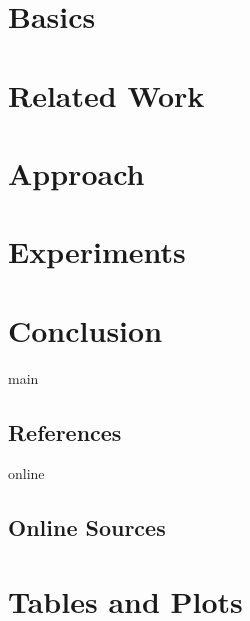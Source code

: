 \documentclass[11pt,a4paper]{report}
\begin{document}
    \chapter{Basics}
    \label{ch:2_basics}
    


    \chapter{Related Work}
    \label{ch:3_related_work}
    


    \chapter{Approach}
    \label{ch:4_approach}
    


    \chapter{Experiments}
    \label{ch:5_experiments}
    


    \chapter{Conclusion}
    \label{ch:6_conclusion}
    

    \newpage

    

    \begin{btSect}{main}
        \section*{References}
        \btPrintCited
    \end{btSect}

    \begin{btSect}{online}
        \section*{Online Sources}
        \btPrintCited
    \end{btSect}


    \appendix


    \chapter{Tables and Plots}
    \label{ch:a_appendix}
    
\end{document}
